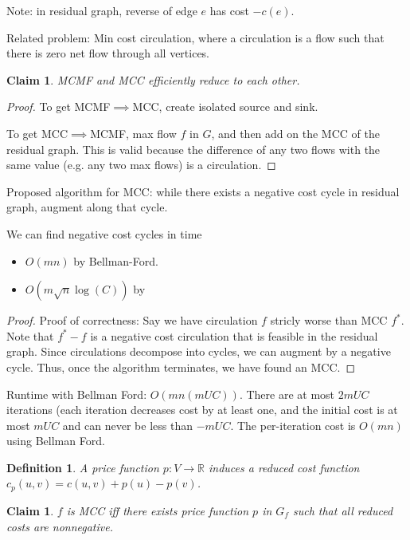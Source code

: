 \documentclass[11pt]{article}
\newcommand{\R}{\mathbb{R}}
\newtheorem{definition}[theorem]{Definition}
\newtheorem{claim}[theorem]{Claim}
\begin{document}
Note: in residual graph, reverse of edge $e$ has cost $-c(e)$.

Related problem: Min cost circulation, where a circulation is a flow such that there is zero net flow through all vertices.

\begin{claim}\label{clm:mcmf-mcc}
    MCMF and MCC efficiently reduce to each other.
\end{claim}

\begin{proof}
    To get MCMF$\implies$MCC, create isolated source and sink.

    To get MCC$\implies$MCMF, max flow $f$ in $G$, and then add on the MCC of the residual graph. This is valid because the difference of
    any two flows with the same value (e.g. any two max flows) is a circulation.
\end{proof}

Proposed algorithm for MCC: while there exists a negative cost cycle in residual graph, augment along that cycle.

We can find negative cost cycles in time
\begin{itemize}
    \item $O(mn)$ by Bellman-Ford.
    \item $O(m\sqrt{n}\log(C))$ by \cite{Goldberg}
\end{itemize}

\begin{proof}
    Proof of correctness: Say we have circulation $f$ stricly worse than MCC $f^*$. Note that $f^*-f$ is a negative cost circulation that is feasible in the residual graph. Since circulations decompose into cycles, we can augment by a negative cycle. Thus, once the algorithm terminates, we have found an MCC.
\end{proof}

Runtime with Bellman Ford: $O(mn(mUC))$. There are at most $2mUC$ iterations (each iteration decreases cost by at least one, and the initial cost is at most $mUC$ and can never be less than $-mUC$. The per-iteration cost is $O(mn)$ using Bellman Ford.

\begin{definition}
    A price function $p:V\to\R$ induces a reduced cost function $c_p(u,v) = c(u,v) + p(u) - p(v)$.
\end{definition}

\begin{claim}
   $f$ is MCC iff there exists price function $p$ in $G_f$ such that all reduced costs are nonnegative.
\end{claim}
\end{document}
